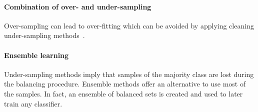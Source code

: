 \documentclass[twoside,11pt]{article}
\begin{document}
\paragraph{Combination of over- and under-sampling}
Over-sampling can lead to over-fitting which can be avoided by applying cleaning under-sampling methods~\citep{prati2009data}.


\paragraph{Ensemble learning}
Under-sampling methods imply that samples of the majority class are lost during the balancing procedure.
Ensemble methods offer an alternative to use most of the samples.
In fact, an ensemble of balanced sets is created and used to later train any classifier.
\end{document}
